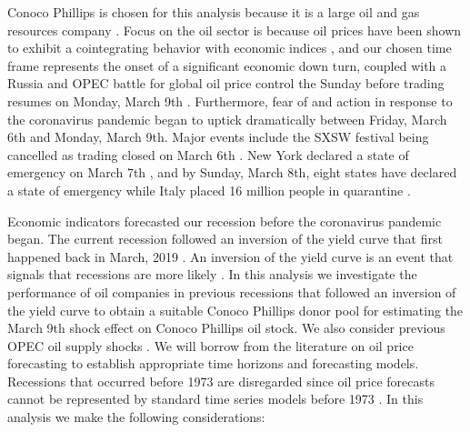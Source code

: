 \documentclass[11pt]{article}
\theoremstyle{definition}
\begin{document}

Conoco Phillips is chosen for this analysis because it is a large oil and gas resources company \citep{conocowhatwedo}. %
Focus on the oil sector is because oil prices have been shown to exhibit a cointegrating behavior with economic indices \citep{he2010global}, and our chosen time frame represents the onset of a significant economic down turn, coupled with a Russia and OPEC battle for global oil price control the Sunday before trading resumes on Monday, March 9th \citep{sukhankin2020russian}. Furthermore, fear of and action in response to the coronavirus pandemic began to uptick dramatically between Friday, March 6th and Monday, March 9th. Major events include the SXSW festival being cancelled as trading closed on March 6th \citep{wang2020impact}. New York declared a state of emergency on March 7th \citep{nygov}, and by Sunday, March 8th, eight states have declared a state of emergency \citep{alonso2020state} while Italy placed 16 million people in quarantine \citep{sjodin2020only}.


Economic indicators forecasted our recession before the coronavirus pandemic began. The current recession followed an inversion of the yield curve that first happened back in March, 2019 \citep{tokic2019yield}. An inversion of the yield curve is an event that signals that recessions are more likely \citep{andolfatto2018yield, bauer2018economic}. In this analysis we investigate the performance of oil companies in previous recessions that followed an inversion of the yield curve to obtain a suitable Conoco Phillips donor pool for estimating the March 9th shock effect on Conoco Phillips oil stock. We also consider previous OPEC oil supply shocks \citep{mensi2014opec}. We will borrow from the literature on oil price forecasting to establish appropriate time horizons and forecasting models. Recessions that occurred before 1973 are disregarded since oil price forecasts cannot be represented by standard time series models before 1973 \citep{alquist2013forecasting}. In this analysis we make the following considerations:
\end{document}
